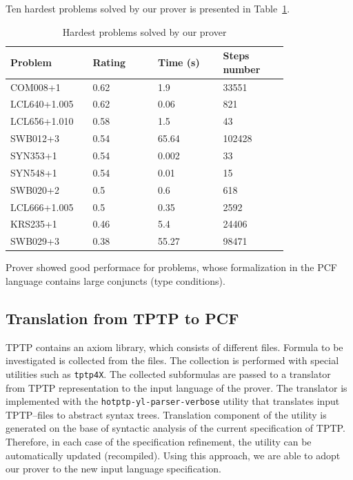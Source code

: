 \documentclass[runningheads,a4paper]{llncs}
\begin{document}
Ten hardest problems solved by our prover is presented in Table~\ref{tbl:2}.
\begin{table}
\caption{Hardest problems solved by our prover}\label{tbl:2}
\begin{tabular}{|p{0.2\linewidth}|p{0.2\linewidth}|p{0.2\linewidth}|p{0.2\linewidth}|}

\hline
\textbf{Problem} & \textbf{Rating} & \textbf{Time (s)} & \textbf{Steps number} \\
\hline
COM008+1 & 0.62 & 1.9 & 33551 \\
\hline
LCL640+1.005 &  0.62 &  0.06 &  821 \\
\hline
LCL656+1.010 &  0.58 &  1.5 &  43 \\
\hline
SWB012+3 &  0.54 &  65.64 &  102428 \\
\hline
SYN353+1 &  0.54 &  0.002 &  33 \\
\hline
SYN548+1 &  0.54 &  0.01 &  15 \\
\hline
SWB020+2 &  0.5 &  0.6 &  618 \\
\hline
LCL666+1.005 &  0.5 &  0.35 &  2592 \\
\hline
KRS235+1 & 0.46 & 5.4 & 24406 \\
\hline
SWB029+3 &  0.38 &  55.27 &  98471 \\
\hline
\end{tabular}
\end{table}


Prover showed good performace for problems, whose formalization in the PCF language contains large conjuncts (type conditions).

\subsection{Translation from TPTP to PCF}
TPTP contains an axiom library, which consists of different files. Formula to be investigated is collected from the files. The collection is performed with special utilities such as \texttt{tptp4X}. The collected subformulas are passed to a translator from TPTP representation to the input language of the prover. The translator is implemented with the \texttt{hotptp-yl-parser-verbose} \cite{TPTPTrans} utility that translates input TPTP--files to abstract syntax trees. Translation component of the utility is generated on the base of syntactic analysis of the current specification of TPTP. Therefore, in each case of the specification refinement, the utility can be automatically updated (recompiled). Using this approach, we are able to adopt our prover to the new input language specification.
\end{document}
